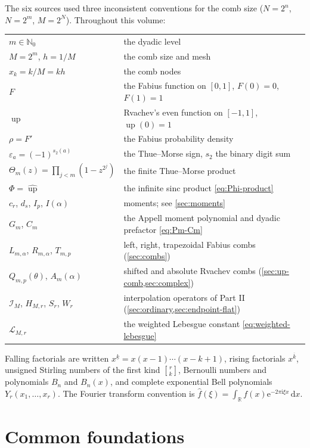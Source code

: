 \documentclass[11pt,oneside]{article}
\numberwithin{equation}{section}
\theoremstyle{definition}
\theoremstyle{remark}
\newcommand{\R}{\mathbb R}
\newcommand{\N}{\mathbb N}
\newcommand{\dd}{\,\mathrm d}
\newcommand{\e}{\mathrm e}
\newcommand{\ii}{\mathrm i}
\newcommand{\Up}{\operatorname{up}}
\newcommand{\eps}{\varepsilon}
\newcommand{\wt}{s_2}
\newcommand{\fall}[2]{#1^{\underline{#2}}}
\newcommand{\rise}[2]{#1^{\overline{#2}}}
\newcommand{\stirlingfirst}[2]{\genfrac{[}{]}{0pt}{}{#1}{#2}}
\newcommand{\Bell}{Y}
\newcommand{\ThetaTM}{\Theta}
\newcommand{\Lag}{\mathcal I}
\newcommand{\Leb}{\mathscr L}
\begin{document}
The six sources used three inconsistent conventions for the comb size
($N=2^n$, $N=2^m$, $M=2^N$).  Throughout this volume:
\begin{center}
\small
\begin{tabular}{@{}ll@{}}
\toprule
$m\in\N_0$ & the dyadic level\\
$M=2^m$, $h=1/M$ & the comb size and mesh\\
$x_k=k/M=kh$ & the comb nodes\\
$F$ & the Fabius function on $[0,1]$, $F(0)=0$, $F(1)=1$\\
$\Up$ & Rvachev's even function on $[-1,1]$, $\Up(0)=1$\\
$\rho=F'$ & the Fabius probability density\\
$\eps_a=(-1)^{\wt(a)}$ & the Thue--Morse sign, $\wt$ the binary digit sum\\
$\ThetaTM_m(z)=\prod_{j<m}(1-z^{2^j})$ & the finite Thue--Morse product\\
$\Phi=\widehat{\Up}$ & the infinite sinc product \eqref{eq:Phi-product}\\
$c_r$, $d_s$, $I_p$, $I(\alpha)$ & moments; see \cref{sec:moments}\\
$G_m$, $C_m$ & the Appell moment polynomial and dyadic prefactor \eqref{eq:Pm-Cm}\\
$L_{m,\alpha}$, $R_{m,\alpha}$, $T_{m,p}$ & left, right, trapezoidal Fabius combs (\cref{sec:combs})\\
$Q_{m,p}(\theta)$, $A_m(\alpha)$ & shifted and absolute Rvachev combs (\cref{sec:up-comb,sec:complex})\\
$\Lag_M$, $H_{M,r}$, $S_r$, $W_r$ & interpolation operators of Part II (\cref{sec:ordinary,sec:endpoint-flat})\\
$\Leb_{M,r}$ & the weighted Lebesgue constant \eqref{eq:weighted-lebesgue}\\
\bottomrule
\end{tabular}
\end{center}
Falling factorials are written $\fall xk=x(x-1)\cdots(x-k+1)$, rising
factorials $\rise xk$, unsigned Stirling numbers of the first kind
$\stirlingfirst rk$, Bernoulli numbers and polynomials $B_n$ and
$B_n(x)$, and complete exponential Bell polynomials
$\Bell_r(x_1,\dots,x_r)$.  The Fourier transform convention is
$\widehat f(\xi)=\int_\R f(x)\e^{-2\pi\ii\xi x}\dd x$.

\section{Common foundations}
\label{sec:foundations}
\end{document}
